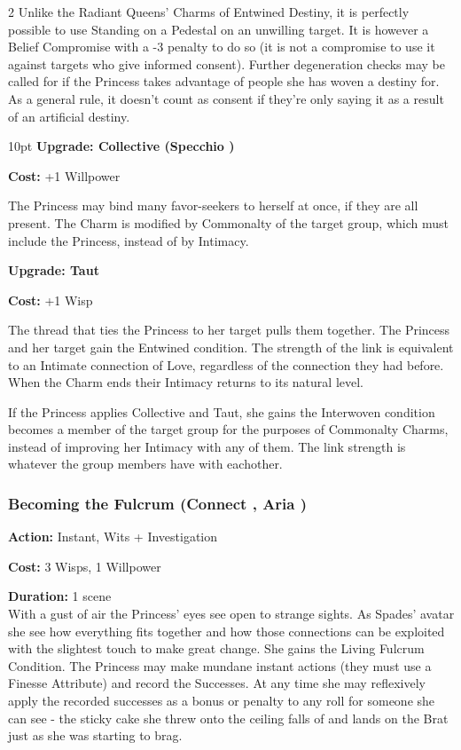 \begin{multicols}{2}
Unlike the Radiant Queens' Charms of Entwined Destiny, it is perfectly possible to use Standing on a Pedestal on an unwilling target. It is however a Belief Compromise with a -3 penalty to do so (it is not a compromise to use it against targets who give informed consent). Further degeneration checks may be called for if the Princess takes advantage of people she has woven a destiny for. As a general rule, it doesn't count as consent if they're only saying it as a result of an artificial destiny.

\begin{myindentpar}{10pt} \textbf{Upgrade: Collective (Specchio \textbullet\textbullet\textbullet\textbullet)}

\noindent \textbf{Cost:} +1 Willpower

The Princess may bind many favor-seekers to herself at once, if they are all present. The Charm is modified by Commonalty of the target group, which must include the Princess, instead of by Intimacy.

\textbf{Upgrade: Taut}

\noindent \textbf{Cost:} +1 Wisp

The thread that ties the Princess to her target pulls them together. The Princess and her target gain the Entwined condition. The strength of the link is equivalent to an Intimate connection of Love, regardless of the connection they had before. When the Charm ends their Intimacy returns to its natural level.

If the Princess applies Collective and Taut, she gains the Interwoven condition becomes a member of the target group for the purposes of Commonalty Charms, instead of improving her Intimacy with any of them. The link strength is whatever the group members have with eachother.\end{myindentpar}


\subsubsection*{Becoming the Fulcrum (Connect \textbullet\textbullet\textbullet\textbullet\textbullet, Aria \textbullet\textbullet\textbullet\textbullet)}

\noindent \textbf{Action:} Instant, Wits + Investigation

\noindent \textbf{Cost:} 3 Wisps, 1 Willpower

\noindent \textbf{Duration:} 1 scene \\

\noindent With a gust of air the Princess' eyes see open to strange sights. As Spades' avatar she see how everything fits together and how those connections can be exploited with the slightest touch to make great change. She gains the Living Fulcrum Condition. The Princess may make mundane instant actions (they must use a Finesse Attribute) and record the Successes. At any time she may reflexively apply the recorded successes as a bonus or penalty to any roll for someone she can see - the sticky cake she threw onto the ceiling falls of and lands on the Brat just as she was starting to brag. 


\end{multicols}
